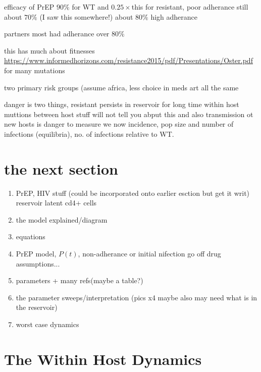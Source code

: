 \documentclass[DIV=15]{scrartcl}
\begin{document}
efficacy of PrEP $90\%$ for WT and $0.25\times$this for resistant, poor adherance still  about $70\%$ (I saw this somewhere!) about $80\%$ high adherance

partners most had adherance over $80\%$

this has much about fitnesses \url{https://www.informedhorizons.com/resistance2015/pdf/Presentations/Oster.pdf} for many mutations 



two primary risk groups (assume africa, less choice in meds art all the same


danger is two things, resistant persists in reservoir for long time within host muttions between host stuff will not tell you abput this and also transmission ot new hosts is danger to measure we now incidence, pop size and number of infections (equilibria), no. of infections relative to WT.






\section{the next section}
\begin{enumerate}
\item PrEP, HIV stuff (could be incorporated onto earlier esction but get it writ) reservoir latent cd4+ cells
\item the model explained/diagram
\item equations 
\item PrEP model, $P(t)$, non-adherance or initial nifection go off drug assumptions...
\item parameters + many refs(maybe a table?)
\item the parameter sweeps/interpretation (pics x4 maybe also may need what is in the reservoir)
\item worst case dynamics


\end{enumerate}
\fi

\section{The Within Host Dynamics}
\label{The Within Host Dynamics}



\end{document}
